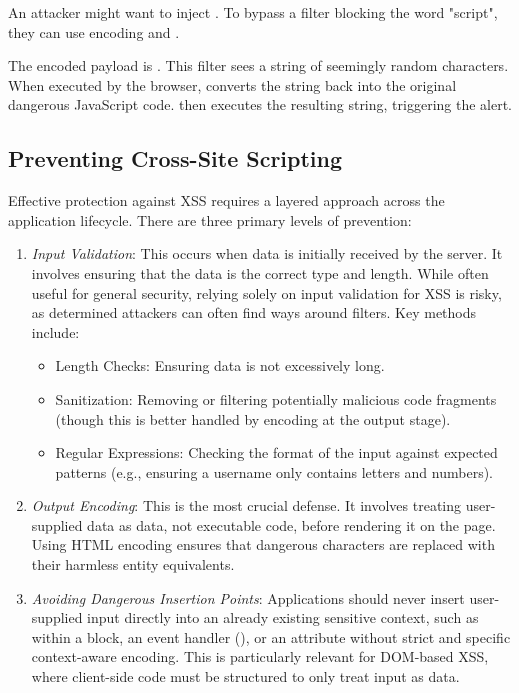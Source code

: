 An attacker might want to inject . To bypass a filter blocking the word "script", they can use encoding and .

The encoded payload is . This filter sees a string of seemingly random characters. When executed by the browser,  converts the string back into the original dangerous JavaScript code.  then executes the resulting string, triggering the alert.

\subsection{Preventing Cross-Site Scripting}
Effective protection against XSS requires a layered approach across the application lifecycle. There are three primary levels of prevention:

\begin{enumerate}
    \item \textit{Input Validation}: This occurs when data is initially received by the server. It involves ensuring that the data is the correct type and length. While often useful for general security, relying solely on input validation for XSS is risky, as determined attackers can often find ways around filters. Key methods include:

          \begin{itemize}
              \item Length Checks: Ensuring data is not excessively long.
              \item Sanitization: Removing or filtering potentially malicious code fragments (though this is better handled by encoding at the output stage).
              \item Regular Expressions: Checking the format of the input against expected patterns (e.g., ensuring a username only contains letters and numbers).
          \end{itemize}

    \item \textit{Output Encoding}: This is the most crucial defense. It involves treating user-supplied data as data, not executable code, before rendering it on the page. Using HTML encoding ensures that dangerous characters are replaced with their harmless entity equivalents.
    \item \textit{Avoiding Dangerous Insertion Points}: Applications should never insert user-supplied input directly into an already existing sensitive context, such as within a  block, an event handler (), or an  attribute without strict and specific context-aware encoding. This is particularly relevant for DOM-based XSS, where client-side code must be structured to only treat input as data.
\end{enumerate}

